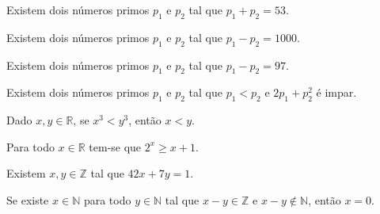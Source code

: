 \begin{exerList}
	\item Existem dois números primos $p_1$ e $p_2$ tal que $p_1 + p_2 = 53$.
	\item Existem dois números primos $p_1$ e $p_2$ tal que $p_1 - p_2 = 1000$.
	\item Existem dois números primos $p_1$ e $p_2$ tal que $p_1 - p_2 = 97$.
	\item Existem dois números primos $p_1$ e $p_2$ tal que $p_1 < p_2$ e $2p_1 + p_2^2$ é impar.
	\item Dado $x, y \in \mathbb{R}$, se $x^3 < y^3$, então $x < y$.
	\item Para todo $x \in \mathbb{R}$ tem-se que $2^x \geq x + 1$.
	\item Existem $x, y \in \mathbb{Z}$ tal que $42x + 7y = 1$.
	\item Se existe $x \in \mathbb{N}$ para todo $y \in \mathbb{N}$ tal que $x - y \in \mathbb{Z}$ e $x - y \notin \mathbb{N}$, então $x = 0$.
\end{exerList}